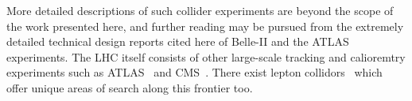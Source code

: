 

More detailed descriptions of such collider experiments are beyond the scope of the work presented here, and further reading may be pursued from the extremely detailed technical design reports cited here of Belle-II and the ATLAS experiments.
The LHC itself consists of other large-scale tracking and calioremtry experiments such as ATLAS~\citep{ATLAS:1999vwa} and CMS~\citep{CMS:2006myw}.
There exist lepton collidors~\citep{belle2_tdr_arxiv} which offer unique areas of search along this frontier too.